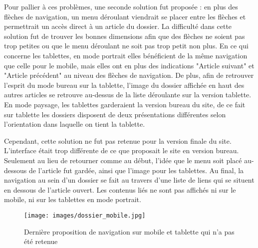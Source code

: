 \documentclass[12pt,a4paper]{article}
\begin{document}
Pour pallier à ces problèmes, une seconde solution fut proposée : en plus des flèches de navigation, un menu déroulant viendrait se placer entre les flèches et permettrait un accès direct à un article du dossier. La difficulté dans cette solution fut de trouver les bonnes dimensions afin que des flèches ne soient pas trop petites ou que le menu déroulant ne soit pas trop petit non plus. En ce qui concerne les tablettes, en mode portrait elles bénéficient de la même navigation que celle pour le mobile, mais elles ont en plus des indications "Article suivant" et "Article précédent" au niveau des flèches de navigation. De plus, afin de retrouver l'esprit du mode bureau sur la tablette, l'image du dossier affichée en haut des autres articles se retrouve au-dessus de la liste déroulante sur la version tablette. En mode paysage, les tablettes garderaient la version bureau du site, de ce fait sur tablette les dossiers disposent de deux présentations différentes selon l'orientation dans laquelle on tient la tablette.\par
Cependant, cette solution ne fut pas retenue pour la version finale du site. L'interface était trop différente de ce que proposait le site en version bureau. Seulement au lieu de retourner comme au début, l'idée que le menu soit placé au-dessous de l'article fut gardée, ainsi que l'image pour les tablettes. Au final, la navigation au sein d'un dossier se fait au travers d'une liste de liens qui se situent en dessous de l'article ouvert. Les contenus liés ne sont pas affichés ni sur le mobile, ni sur les tablettes en mode portrait.\par

\begin{figure}[h!]
\centering\texttt{[image: images/dossier\_mobile.jpg]} 
\caption{Dernière proposition de navigation sur mobile et tablette qui n'a pas été retenue}
\end{figure}

\newpage
\end{document}
